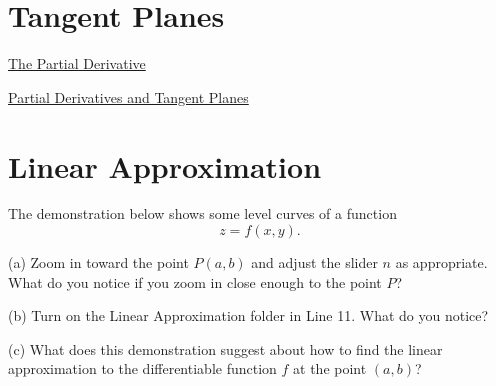 \documentclass{ximera}
\begin{document}
\section{Tangent Planes}
\begin{exploration}  \label{Edf754665}

 
\begin{onlineOnly}
    \begin{center}
\end{center}
\end{onlineOnly}


\href{https://www.desmos.com/calculator/y0h5kuvmbt}{The Partial Derivative}

\end{exploration}




\begin{exploration}  \label{Ede5fhj4665}
\href{https://www.geogebra.org/m/Hud6Hnpk}{Partial Derivatives and Tangent Planes}
\end{exploration}


\section{Linear Approximation}
The demonstration below shows some level curves of a function
\[
   z = f(x,y) .
\]

(a) Zoom in toward the point $P(a,b)$ and adjust the slider $n$ as appropriate. What do you notice if you zoom in close enough to the point $P$?

(b) Turn on the Linear Approximation folder in Line 11. What do you notice?

(c) What does this demonstration suggest about how to find the linear approximation to the differentiable function $f$ at the point $(a,b)$?

\begin{exploration}   \label{Edsfg907}
 
\begin{onlineOnly}
    \begin{center}
\end{center}
\end{onlineOnly}
\end{exploration}
\end{document}
